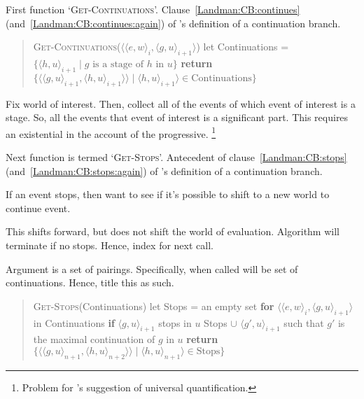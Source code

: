 \begin{note}
  First function `\textsc{Get-Continuations}'.
  Clause~\ref{Landman:CB:continues} (and~\ref{Landman:CB:continues:again}) of \citeauthor{Landman:1992wh}'s definition of a continuation branch.
  \begin{quote}
    \textsc{Get-Continuations}(\(\langle \langle e,w \rangle_{i}, \langle g,u \rangle_{i+1}  \rangle\))\newline
    let Continuations = \(\{\langle h,u \rangle_{i+1} \mid g \text{ is a stage of } h \text{ in } u \}\)\newline
    \textbf{return} \(\{\langle \langle g,u \rangle_{i+1}, \langle h,u \rangle_{i+1} \rangle \rangle \mid \langle h,u \rangle_{i+1} \rangle \in \text{Continuations}\}\)
  \end{quote}
  Fix world of interest.
  Then, collect all of the events of which event of interest is a stage.
  So, all the events that event of interest is a significant part.
  This requires an existential in the account of the progressive.%
  \footnote{
    Problem for \citeauthor{Szabo:2004ul}'s suggestion of universal quantification.
  }
\end{note}

\begin{note}
  Next function is termed `\textsc{Get-Stops}'.
  Antecedent of clause~\ref{Landman:CB:stops} (and~\ref{Landman:CB:stops:again}) of \citeauthor{Landman:1992wh}'s definition of a continuation branch.

  If an event stops, then want to see if it's possible to shift to a new world to continue event.

  This shifts forward, but does not shift the world of evaluation.
  Algorithm will terminate if no stops.
  Hence, index for next call.

  Argument is a set of pairings.
  Specifically, when called will be set of continuations.
  Hence, title this as such.
  \begin{quote}
    \textsc{Get-Stops}(Continuations)\newline
    let Stops = an empty set\newline
    \textbf{for} \(\langle \langle e,w \rangle_{i}, \langle g,u \rangle_{i+1}  \rangle\) in Continuations\newline
    \phantom{mm} \textbf{if} \(\langle g,u \rangle_{i+1}\) stops in \(u\) \newline
    \phantom{mmmm} Stops \(\cup\) \(\langle g',u \rangle_{i+1}\) such that \(g'\) is the maximal continuation of \(g\) in \(u\)\newline
    \textbf{return} \(\{\langle \langle g,u \rangle_{n+1}, \langle h,u \rangle_{n+2}  \rangle \rangle \mid \langle h,u \rangle_{n+1} \rangle \in \text{Stops}\}\)
  \end{quote}
\end{note}

